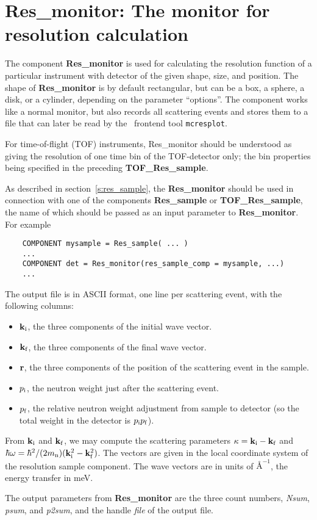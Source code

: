 \section{Res\_monitor: The monitor for resolution calculation}
\label{s:res_monitor}


The component {\bf Res\_monitor} is used for calculating the
resolution function of a particular instrument with detector of the
given shape, size, and position.
The shape of {\bf Res\_monitor} is by default rectangular,
but can be a box, a sphere, a disk, or a cylinder,
depending on the parameter ``options''.
The component works like a normal monitor, but
also records all scattering events and stores
them to a file that can later be read by 
the \MCS\ frontend tool \verb+mcresplot+.

For time-of-flight (TOF) instruments, {Res\_monitor} should be understood 
as giving the resolution of one time bin of the TOF-detector only; 
the bin properties being specified in the preceding {\bf TOF\_Res\_sample}.

As described in section~\ref{s:res_sample},
the {\bf Res\_monitor} should be used in connection with one of the
components {\bf Res\_sample} or {\bf TOF\_Res\_sample}, 
the name of which should be passed as an
input parameter to \textbf{Res\_monitor}. For example
\begin{lstlisting}
    COMPONENT mysample = Res_sample( ... )
    ...
    COMPONENT det = Res_monitor(res_sample_comp = mysample, ...)
    ...
\end{lstlisting}

The output file is in ASCII format, one line per scattering event, with
the following columns:
\begin{itemize}
\item ${\bf k}_{\rm i}$, the three components of the initial wave vector.
\item ${\bf k}_{\rm f}$, the three components of the final wave vector.
\item ${\bf r}$, the three components of the position of the scattering
  event in the sample.
\item $p_{\rm i}$, the neutron weight just after the scattering event.
\item $p_{\rm f}$, the relative neutron weight adjustment from sample to
  detector (so the total weight in the detector is $p_{\rm i}p_{\rm f}$).
\end{itemize}
From ${\bf k}_{\rm i}$ and ${\bf k}_{\rm f}$, we may compute 
the scattering parameters 
$\kappa = {\bf k}_{\rm i} - {\bf k}_{\rm f}$ and 
$\hbar \omega = \hbar^2/(2 m_{\rm n})({\bf k}_{\rm i}^2 - {\bf k}_{\rm f}^2)$.
The vectors are given in the local coordinate system of the resolution
sample component. The wave vectors are in units of $\mbox{\AA}^{-1}$, the
energy transfer in meV.

The output parameters from {\bf Res\_monitor}
are the three count numbers, \textit{Nsum}, \textit{psum},
and \textit{p2sum}, and the handle \textit{file} of the output file.
